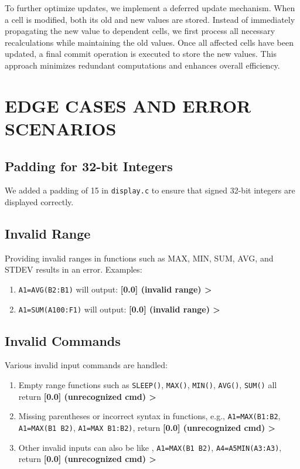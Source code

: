 \documentclass[a4paper]{article}
\begin{document}
To further optimize updates, we implement a deferred update mechanism. When a cell is modified, both its old and new values are stored. Instead of immediately propagating the new value to dependent cells, we first process all necessary recalculations while maintaining the old values. Once all affected cells have been updated, a final commit operation is executed to store the new values. This approach minimizes redundant computations and enhances overall efficiency.

\section{EDGE CASES AND ERROR SCENARIOS}

\subsection{Padding for 32-bit Integers}
We added a padding of 15 in \texttt{display.c} to ensure that signed 32-bit integers are displayed correctly.

\subsection{Invalid Range}
Providing invalid ranges in functions such as MAX, MIN, SUM, AVG, and STDEV results in an error. Examples:
\begin{enumerate}
    \item \texttt{A1=AVG(B2:B1)} will output: \textbf{[0.0] (invalid range) >}
    \item \texttt{A1=SUM(A100:F1)} will output: \textbf{[0.0] (invalid range) >}
\end{enumerate}

\subsection{Invalid Commands}
Various invalid input commands are handled:
\begin{enumerate}
    \item Empty range functions such as \texttt{SLEEP()}, \texttt{MAX()}, \texttt{MIN()}, \texttt{AVG()}, \texttt{SUM()} all return \textbf{[0.0] (unrecognized cmd) >}
    \item Missing parentheses or incorrect syntax in functions, e.g., \texttt{A1=MAX(B1:B2}, \texttt{A1=MAX(B1 B2)}, \texttt{A1=MAX B1:B2)}, return \textbf{[0.0] (unrecognized cmd) >}
    \item Other invalid inputs can also be like
    , \texttt{A1=MAX(B1 B2)}, \texttt{A4=A5MIN(A3:A3)}, return \textbf{[0.0] (unrecognized cmd) >}
\end{enumerate}
\end{document}
